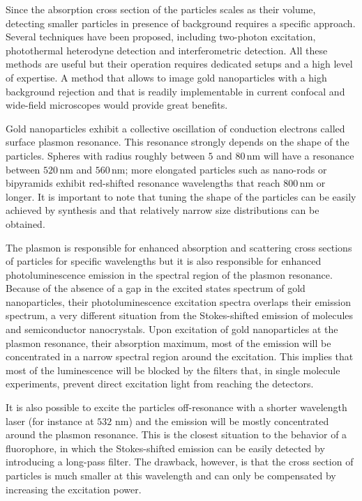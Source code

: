 \documentclass[journal=nalefd,manuscript=letter]{achemso}
\newcommand{\nm}{\ensuremath{\,\textrm{nm}}}
\begin{document}
Since the absorption cross section of the particles scales as their volume, detecting
smaller particles in presence of background requires a specific approach.
Several techniques have been proposed, including two-photon
excitation\cite{VandenBroek2013}, photothermal \mbox{heterodyne}
detection\cite{Berciaud2006} and interferometric detection\cite{Ignatovich2006}.
All these methods are useful but their operation requires dedicated setups and a high level of
expertise. A method that allows to image gold nanoparticles with
a high background rejection and that is readily implementable in current
confocal and wide-field microscopes would provide great benefits.

Gold nanoparticles exhibit a collective oscillation of conduction electrons
called surface plasmon resonance\cite{Bouhelier2005}. This resonance strongly
depends on the shape of the particles\cite{Dulkeith2004}\cite{Link2000a}.
Spheres with radius roughly between $5$ and $80\nm$ will have a resonance
between $520\nm$ and $560\nm$; more elongated particles such as nano-rods or
bipyramids\cite{Rao2015} exhibit red-shifted resonance wavelengths that reach
$800\nm$ or longer\cite{Ngoc2015}. It is important to note that tuning the shape
of the particles can be easily achieved by synthesis and that relatively narrow
size distributions can be obtained\cite{Nikoobakht2003}.

The plasmon is responsible for enhanced absorption and scattering cross
sections\cite{Ni2008} of particles for specific wavelengths but it is also
responsible for enhanced photoluminescence emission in the spectral region of
the plasmon resonance. Because of the absence of a gap in the excited states
spectrum of gold nanoparticles, their photoluminescence excitation spectra
overlaps their emission spectrum\cite{Yorulmaz2012}, a very different situation
from the Stokes-shifted emission of molecules and semiconductor nanocrystals.
Upon excitation of gold nanoparticles at the plasmon resonance, their absorption
maximum, most of the emission will be concentrated in a narrow spectral region
around the excitation. This implies that most of the luminescence will be
blocked by the filters that, in single molecule experiments, prevent direct
excitation light from reaching the detectors.

It is also possible to excite the particles off-resonance with a shorter
wavelength laser (for instance at $532\,\nm$) and the emission will be mostly
concentrated around the plasmon resonance. This is the closest situation to the
behavior of a fluorophore, in which the Stokes-shifted emission can be easily
detected by introducing a long-pass filter. The drawback, however, is that the
cross section of particles is much smaller at this wavelength and can only be
compensated by increasing the excitation power.
\end{document}
